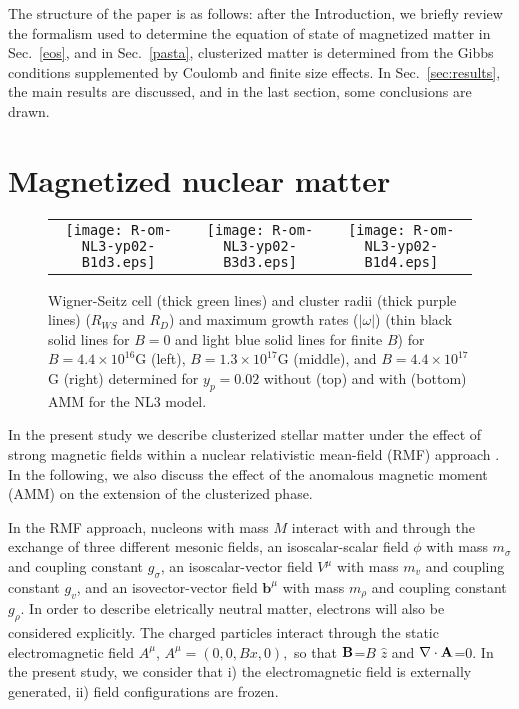 \documentclass[epj]{svjour}
\begin{document}
The structure of the paper is as follows: after the Introduction, we briefly review the formalism used to
determine the equation of state of magnetized matter in Sec.~\ref{eos}, and in Sec.~\ref{pasta}, clusterized matter is determined from the Gibbs conditions supplemented by  
Coulomb and finite size effects. In Sec.~\ref{sec:results}, the main results
are discussed, and in the last section, some conclusions are drawn.



\section{Magnetized nuclear matter \label{eos}}


\begin{figure*}[htp]
  \begin{tabular}{ccc}   
  \texttt{[image: R-om-NL3-yp02-B1d3.eps]} & 
   \texttt{[image: R-om-NL3-yp02-B3d3.eps]} & 
  \texttt{[image: R-om-NL3-yp02-B1d4.eps]} \\
    \end{tabular}
    \caption{Wigner-Seitz cell (thick green lines) and cluster radii
      (thick purple lines)  ($R_{WS}$ and $R_{D}$) and maximum growth rates
  ($|\omega|$) (thin black solid lines for $B=0$ and light blue solid lines for finite $B$)   for  $B= 4.4 \times 10^{16}$G (left), $B= 1.3 \times 10^{17}$G
  (middle), and $B= 4.4 \times 10^{17}$G  (right) determined for
  $y_p=0.02$ without (top) and with (bottom) AMM for the NL3 model.
 } 
\label{fig1}
\end{figure*}


In the present study we describe clusterized  stellar  matter   under
the effect of strong magnetic fields within
a nuclear relativistic mean-field  (RMF) approach
\cite{Broderick2000,Rabhi08}. In the following,  we  also discuss
the effect of the anomalous
magnetic moment (AMM) on the extension of the clusterized phase.


 In the RMF approach, nucleons with mass $M$ interact with and through
 the exchange of 
 three different mesonic fields, an
isoscalar-scalar field $\phi$ with mass $m_\sigma$ and coupling constant $g_\sigma$, an isoscalar-vector
field $V^{\mu}$ with mass $m_v$ and coupling constant $g_v$, and an isovector-vector field
$\mathbf b^{\mu}$ with mass $m_\rho$ and coupling constant $g_\rho$.  In order to describe
eletrically neutral matter, electrons will
also be considered explicitly.
The charged particles interact through the static electromagnetic field $A^{\mu}$,
$
 A^{\mu}=(0,0,Bx,0),
$
so that $\bf B$=$B$ $\hat{z}$ and $\nabla \cdot {\bf A}$=0.
In the present study, we consider that i) the
electromagnetic field is externally generated, ii)  field
configurations are frozen.
\end{document}
